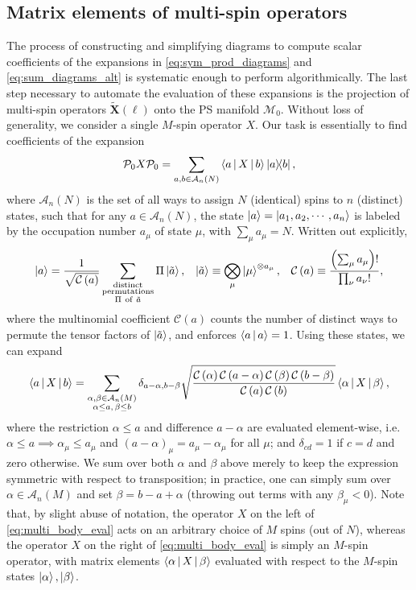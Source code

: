 \documentclass[nofootinbib,notitlepage,11pt]{revtex4-2}
\renewcommand{\t}{\text} %
\newcommand{\f}[2]{\dfrac{#1}{#2}} %
\newcommand{\p}[1]{\left(#1\right)} %
\newcommand{\bk}{\Braket} %
\newcommand{\m}{\bm} %
\newcommand{\1}{\mathds{1}}
\newcommand{\A}{\mathcal{A}}
\newcommand{\C}{\mathcal{C}}
\newcommand{\M}{\mathcal{M}}
\renewcommand{\P}{\mathcal{P}}
\newcommand{\ot}{\widetilde}
\begin{document}
\subsection{Matrix elements of multi-spin operators}

The process of constructing and simplifying diagrams to compute scalar coefficients of the expansions in \eqref{eq:sym_prod_diagrams} and \eqref{eq:sum_diagrams_alt} is systematic enough to perform algorithmically.
The last step necessary to automate the evaluation of these expansions is the projection of multi-spin operators $\ot{\m X}\p{\ell}$ onto the PS manifold $\M_0$.
Without loss of generality, we consider a single $M$-spin operator $X$.
Our task is essentially to find coefficients of the expansion
\begin{align}
  \P_0 X \P_0
  = \sum_{a,b\in\A_n\p{N}} \bk{a|X|b} \op{a}{b},
\end{align}
where $\A_n\p{N}$ is the set of all ways to assign $N$ (identical) spins to $n$ (distinct) states, such that for any $a\in\A_n\p{N}$, the state $\ket{a}=\ket{a_1,a_2,\cdots,a_n}$ is labeled by the occupation number $a_\mu$ of state $\mu$, with $\sum_\mu a_\mu = N$.
Written out explicitly,
\begin{align}
  \ket{a} = \f1{\sqrt{\C\p{a}}}
  \sum_{\substack{\t{distinct}\\\t{permutations}\\\Pi~\t{of}~\tilde a}}
  \Pi \ket{\tilde a},
  &&
  \ket{\tilde a} \equiv \bigotimes_\mu \ket{\mu}^{\otimes a_\mu},
  &&
  \C\p{a} \equiv \f{\p{\sum_\mu a_\mu}!}{\prod_\nu a_\nu!},
\end{align}
where the multinomial coefficient $\C\p{a}$ counts the number of distinct ways to permute the tensor factors of $\ket{\tilde a}$, and enforces $\bk{a|a}=1$.
Using these states, we can expand
\begin{align}
  \bk{a|X|b}
  = \sum_{\substack{\alpha,\beta\in\A_n\p{M}\\\alpha\le a,\,\beta\le b}}
  \delta_{a-\alpha,b-\beta}
  \sqrt{\f{\C\p{\alpha}\C\p{a-\alpha}\C\p{\beta}\C\p{b-\beta}}
    {\C\p{a}\C\p{b}}}
  \bk{\alpha|X|\beta},
  \label{eq:multi_body_eval}
\end{align}
where the restriction $\alpha\le a$ and difference $a-\alpha$ are evaluated element-wise, i.e.~$\alpha\le a\implies \alpha_\mu\le a_\mu$ and $\p{a-\alpha}_\mu=a_\mu-\alpha_\mu$ for all $\mu$; and $\delta_{cd}=1$ if $c=d$ and zero otherwise.
We sum over both $\alpha$ and $\beta$ above merely to keep the expression symmetric with respect to transposition; in practice, one can simply sum over $\alpha\in\A_n\p{M}$ and set $\beta=b-a+\alpha$ (throwing out terms with any $\beta_\mu<0$).
Note that, by slight abuse of notation, the operator $X$ on the left of \eqref{eq:multi_body_eval} acts on an arbitrary choice of $M$ spins (out of $N$), whereas the operator $X$ on the right of \eqref{eq:multi_body_eval} is simply an $M$-spin operator, with matrix elements $\bk{\alpha|X|\beta}$ evaluated with respect to the $M$-spin states $\ket\alpha,\ket\beta$.
\end{document}
